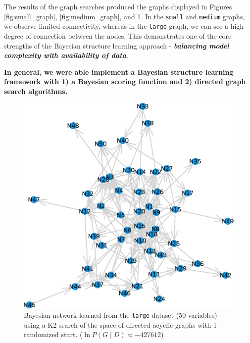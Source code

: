 \documentclass[10pt,letterpaper]{article}
\begin{document}
	\vspace*{0.1 in}
	
	The results of the graph searches produced the graphs displayed in Figures \ref{fig:small_graph}, \ref{fig:medium_graph}, and \ref{fig:large_graph}. In the \texttt{small} and \texttt{medium} graphs, we observe limited connectivity, whereas in the \texttt{large} graph, we can see a high degree of connection between the nodes. This demonstrates one of the core strengths of the Bayesian structure learning approach - \textbf{\textit{balancing model complexity with availability of data}}. 
	
	\vspace*{0.1 in}
	
	\textbf{In general, we were able implement a Bayesian structure learning framework with 1) a Bayesian scoring function and 2) directed graph search algorithms.}

	\begin{figure}[h!] %
		\centering
		\includegraphics[height=0.8\textheight]{figs/large-K2-1}
		\setlength{\belowcaptionskip}{-10pt}
		\caption{Bayesian network learned from the \texttt{large} dataset (50 variables) using a K2 search of the space of directed acyclic graphs with 1 randomized start. ($\ln P(G\mid D) \approx - 427612$)}
		\label{fig:large_graph}
	\end{figure}	
	
\end{document}
